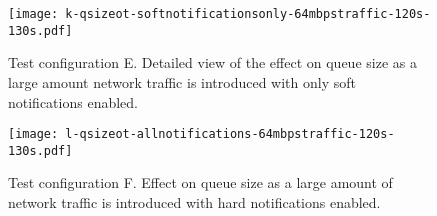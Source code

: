 \begin{figure}[h!]
\centering
\texttt{[image: k-qsizeot-softnotificationsonly-64mbpstraffic-120s-130s.pdf]}
\caption{
    Test configuration E.
Detailed view of the effect on queue size as a large amount network traffic is introduced with only soft notifications enabled.
}
\label{fig:plotk}
\centering
\end{figure}

\begin{figure}[h!]
\centering
\texttt{[image: l-qsizeot-allnotifications-64mbpstraffic-120s-130s.pdf]}
\caption{Test configuration F. Effect on queue size as a large amount of network traffic is introduced with hard notifications enabled.}
\label{fig:plotl}
\end{figure}
